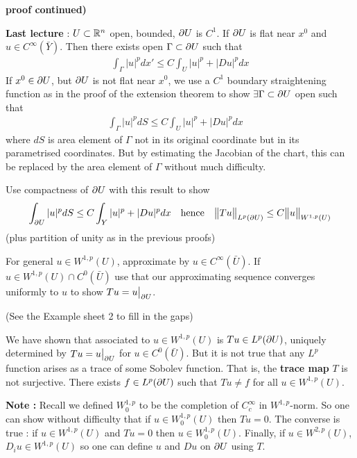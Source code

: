 \documentclass[10pt,a4paper]{report}
\newenvironment{proof}
{\begin{changemargin}{1cm}{0.5cm} 
	}%
	{\end{changemargin}
}
\begin{document}
\begin{proof}
\textbf{proof continued) } 

\textbf{Last lecture} : $U \subset \mathbb{R}^n$ open, bounded, $\partial U$ is $C^1$. If $\partial U$ is flat near $x^0$ and $u\in C^{\infty} (\bar{Y})$. Then there exists open $\Gamma \subset \partial U$ such that
\begin{align*}
\int_{\Gamma} |u|^p dx' \leq C \int_U |u|^p + |Du|^p dx
\end{align*}
If $x^0 \in \partial U$, but $\partial U$ is not flat near $x^0$, we use a $C^1$ boundary straightening function as in the proof of the extension theorem to show $\exists \Gamma \subset \partial U$ open such that
\begin{align*}
\int_{\Gamma} |u|^p dS \leq C \int_{U} |u|^p + |Du|^p dx \quad 
\end{align*}
where $dS$ is area element of $\Gamma$ not in its original coordinate but in its parametrised coordinates. But by estimating the Jacobian of the chart, this can be replaced by the area element of $\Gamma$ without much difficulty.

\quad Use compactness of $\partial U$ with this result to show
\begin{align*}
\int_{\partial U} |u|^p dS \leq C\int_{Y} |u|^p + |Du|^p dx \quad \text{hence} \quad \bigl\lVert Tu\bigr\rVert_{L^p(\partial U)} \leq C\bigl\lVert u\bigr\rVert_{W^{1,p}(U)}
\end{align*}
(plus partition of unity as in the previous proofs)

\quad For general $u\in W^{1,p}(U)$, approximate by $u\in C^{\infty}(\bar{U})$. If $u\in W^{1,p}(U) \cap C^0(\bar{U})$ use that our approximating sequence converges uniformly to $u$ to show $Tu = u\big|_{\partial U}$.

(See the Example sheet 2 to fill in the gaps)
\end{proof}
\s

We have shown that associated to $u \in W^{1,p}(U)$ is $Tu \in L^p(\partial U)$, uniquely determined by $Tu=u\big|_{\partial U}$ for $u \in C^0(\bar{U})$. But it is not true that any $L^p$ function arises as a trace of some Sobolev function. That is, the \textbf{trace map} $T$ is not surjective. There exists $f \in L^p(\partial U)$ such that $Tu \neq f$ for all $u \in W^{1,p}(U)$.
\s

\textbf{Note :} Recall we defined $W_0^{1,p}$ to be the completion of $C_c^{\infty}$ in $W^{1,p}$-norm. So one can show without difficulty that if $u \in W_0^{1,p}(U)$ then $Tu=0$. The converse is true : if $u\in W^{1,p}(U)$ and $Tu =0$ then $u \in W_0^{1,p}(U)$. Finally, if $u\in W^{2,p}(U)$, $D_i u \in W^{1,p}(U)$ so one can define $u$ and $Du$ on $\partial U$ using $T$.
\s
\end{document}
